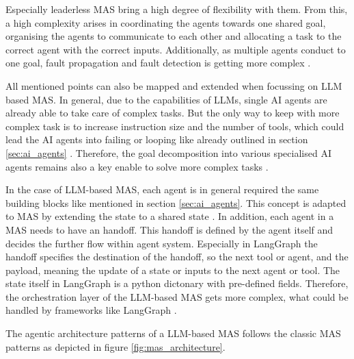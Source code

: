 \documentclass[a4paper,oneside,bibliography=totoc]{scrbook}
\begin{document}
Especially leaderless \ac{MAS} bring a high degree of flexibility with them. From this, a high complexity arises in coordinating the agents towards one shared goal, organising the agents to communicate to each other and allocating a task to the correct agent with the correct inputs. Additionally, as multiple agents conduct to one goal, fault propagation and fault detection is getting more complex \cite{Dorri2018}.

All mentioned points can also be mapped and extended when focussing on \ac{LLM} based \ac{MAS}. In general, due to the capabilities of \acp{LLM}, single \ac{AI} agents are already able to take care of complex tasks. But the only way to keep with more complex task is to increase instruction size and the number of tools, which could lead the \ac{AI} agents into failing or looping like already outlined in section \ref{sec:ai_agents} \cite{OpenAI2025}. Therefore, the goal decomposition into various specialised \ac{AI} agents remains also a key enable to solve more complex tasks \cite{Sapkota2025}.

In the case of \ac{LLM}-based \ac{MAS}, each agent is in general required the same building blocks like mentioned in section \ref{sec:ai_agents}. This concept is adapted to \ac{MAS} by extending the state to a shared state \cite{Sapkota2025}. In addition, each agent in a \ac{MAS} needs to have an handoff. This handoff is defined by the agent itself and decides the further flow within agent system. Especially in LangGraph the handoff specifies the destination of the handoff, so the next tool or agent, and the payload, meaning the update of a state or inputs to the next agent or tool. The state itself in LangGraph is a python dictonary with pre-defined fields. Therefore, the orchestration layer of the \ac{LLM}-based \ac{MAS} gets more complex, what could be handled by frameworks like LangGraph \cite{LangChain2025b}.

The agentic architecture patterns of a \ac{LLM}-based \ac{MAS} follows the classic \ac{MAS} patterns as depicted in figure \ref{fig:mas_architecture}.
\end{document}

